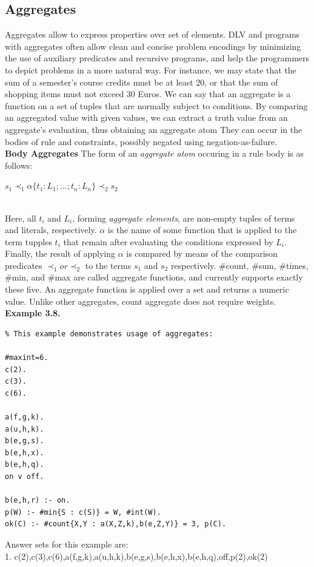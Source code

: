 \documentclass[14pt,a4paper, titlepage]{article}
\begin{document}
\subsection{Aggregates}
Aggregates allow to express properties over set of elements. DLV and \hex{} programs with aggregates often allow clean and concise problem encodings by minimizing the use of auxiliary predicates and recursive programs, and help the programmers to depict problems in a more natural way. For instance, we may state that the sum of a semester's course credits must be at least 20, or that the sum of shopping items must not exceed 30 Euros. We can say that an aggregate is a function on a set of tuples that are normally subject to conditions. By comparing an aggregated value with given values, we can extract a truth value from an aggregate's evaluation, thus obtaining an aggregate atom 
They can occur in the bodies of rule and constraints, possibly negated using negation-as-failure. \\ \textbf{Body Aggregates} The form of an \textit{aggregate atom} occuring in a rule body is as follows:\\ \centerline{$s_1 \prec_1 \alpha \{ t_1:L_1;...;t_n:L_n\} \prec_2 s_2$} 
\\ Here, all \textit{$t_i$} and \textit{$L_i$}, forming \textit{aggregate elements}, are non-empty tuples of terms and literals, respectively. $\alpha$ is the name of some function that is applied to the term tupples \textit{$t_i$} that remain after evaluating the conditions expressed by $L_i$. Finally,  the result of applying $\alpha$ is compared by means of the comparison predicates $\prec_1 or \prec_2$ to the terms $s_1$ and $s_2$ respectively. \#count, \#sum, \#times, \#min, and \#max are called aggregate functions, and \dlvhex{} currently supports exactly these five. An aggregate function is applied over a set and returns a numeric value. Unlike other aggregates, count aggregate does not require weights.    
\\ \textbf{Example 3.8.}
\begin{lstlisting}
% This example demonstrates usage of aggregates:

#maxint=6.
c(2).
c(3).
c(6).

a(f,g,k).
a(u,h,k).
b(e,g,s).
b(e,h,x).
b(e,h,q).
on v off.

b(e,h,r) :- on.
p(W) :- #min{S : c(S)} = W, #int(W).
ok(C) :- #count{X,Y : a(X,Z,k),b(e,Z,Y)} = 3, p(C).
\end{lstlisting}
Answer sets for this example are:
\\ 1. {c(2),c(3),c(6),a(f,g,k),a(u,h,k),b(e,g,s),b(e,h,x),b(e,h,q),off,p(2),ok(2)}
\end{document}
